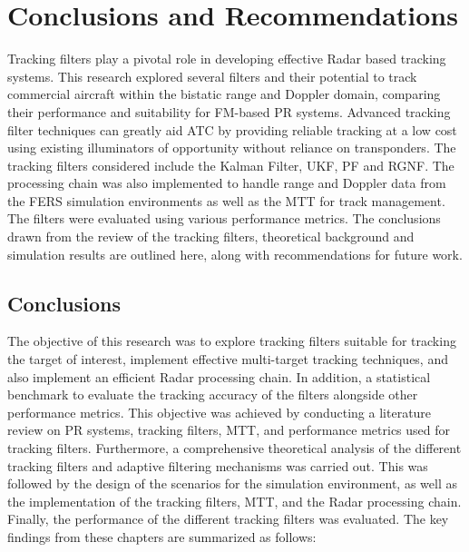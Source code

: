 \newpage
\chapter{Conclusions and Recommendations}Tracking filters play a pivotal role in developing effective \ac{Radar} based tracking systems. This research explored several filters and their potential to track commercial aircraft within the bistatic range and Doppler domain, comparing their performance and suitability for FM-based \ac{PR} systems. Advanced tracking filter techniques can greatly aid \ac{ATC} by providing reliable tracking at a low cost using existing illuminators of opportunity without reliance on transponders. The tracking filters considered include the Kalman Filter, \ac{UKF}, \ac{PF} and \ac{RGNF}.
\newline
\newline
The processing chain was also implemented to handle range and Doppler data from the \ac{FERS} simulation environments as well as the \ac{MTT} for track management. The filters were evaluated using various performance metrics. The conclusions drawn from the review of the tracking filters, theoretical background and simulation results are outlined here, along with recommendations for future work.

\section{Conclusions}
The objective of this research was to explore tracking filters suitable for tracking the target of interest,  implement effective multi-target tracking techniques, and also implement an efficient \ac{Radar} processing chain. In addition, a statistical benchmark to evaluate the tracking accuracy of the filters alongside other performance metrics. 
\newline
\newline
This objective was achieved by conducting a literature review on \ac{PR} systems, tracking filters, \ac{MTT}, and performance metrics used for tracking filters. Furthermore, a comprehensive theoretical analysis of the different tracking filters and adaptive filtering mechanisms was carried out. This was followed by the design of the scenarios for the simulation environment, as well as the implementation of the tracking filters, \ac{MTT}, and the \ac{Radar} processing chain. Finally, the performance of the different tracking filters was evaluated. The key findings from these chapters are summarized as follows:

